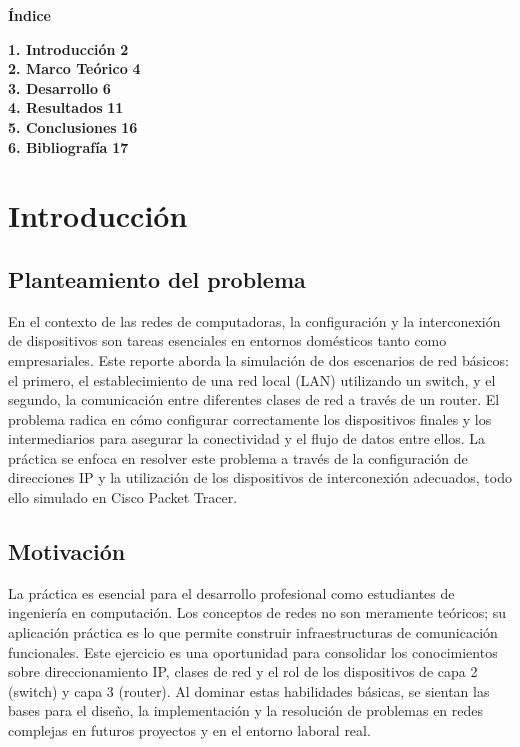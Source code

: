 \documentclass[letterpaper,12pt,oneside]{article}
\begin{document}
	\newpage
	\begin{center}
		{\LARGE \textbf{Índice}}
	\end{center}
	\vspace{1cm}
	
	\begin{flushleft}
		\textbf{1. Introducción} \hfill \textbf{2} \\[0.5cm]
		\textbf{2. Marco Teórico} \hfill \textbf{4} \\[0.5cm]
		\textbf{3. Desarrollo} \hfill \textbf{6} \\[0.5cm]
		\textbf{4. Resultados} \hfill \textbf{11} \\[0.5cm]
		\textbf{5. Conclusiones} \hfill \textbf{16} \\[0.5cm]
        \textbf{6. Bibliografía} \hfill \textbf{17} \\[0.5cm]
	\end{flushleft}
\clearpage

\section{Introducción}
\subsection*{Planteamiento del problema}
En el contexto de las redes de computadoras, la configuración y la interconexión de dispositivos son tareas esenciales en entornos domésticos tanto como empresariales. Este reporte aborda la simulación de dos escenarios de red básicos: el primero, el establecimiento de una red local (LAN) utilizando un switch, y el segundo, la comunicación entre diferentes clases de red a través de un router. El problema radica en cómo configurar correctamente los dispositivos finales y los intermediarios para asegurar la conectividad y el flujo de datos entre ellos. La práctica se enfoca en resolver este problema a través de la configuración de direcciones IP y la utilización de los dispositivos de interconexión adecuados, todo ello simulado en Cisco Packet Tracer.

\subsection*{Motivación}
La práctica es esencial para el desarrollo profesional como estudiantes de ingeniería en computación. Los conceptos de redes no son meramente teóricos; su aplicación práctica es lo que permite construir infraestructuras de comunicación funcionales. Este ejercicio es una oportunidad para consolidar los conocimientos sobre direccionamiento IP, clases de red y el rol de los dispositivos de capa 2 (switch) y capa 3 (router). Al dominar estas habilidades básicas, se sientan las bases para el diseño, la implementación y la resolución de problemas en redes complejas en futuros proyectos y en el entorno laboral real.
\end{document}
